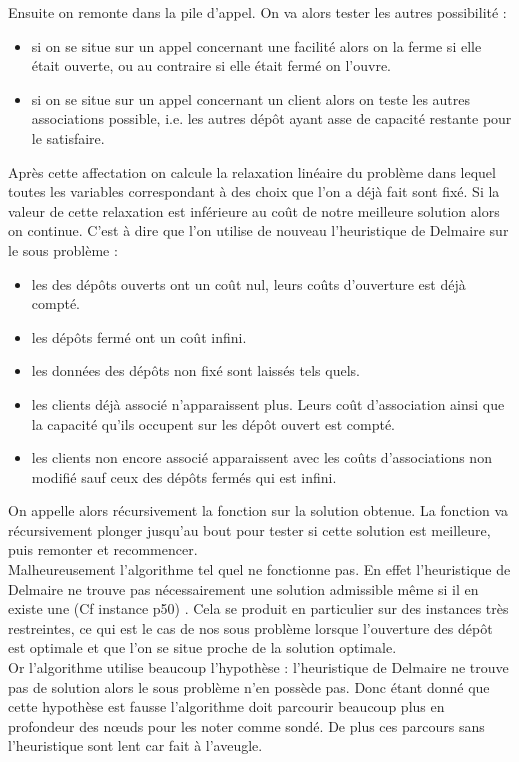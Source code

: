\documentclass[12pt,a4paper]{article}
\begin{document}
Ensuite on remonte dans la pile d’appel. On va alors tester les autres possibilité :
\begin{itemize}
\item
si on se situe sur un appel concernant une facilité alors on la ferme si elle était ouverte, ou au contraire si elle était fermé on l'ouvre.
\item
si on se situe sur un appel concernant un client alors on teste les autres associations possible, i.e. les autres dépôt ayant asse de capacité restante pour le satisfaire.
\end{itemize}
Après cette affectation on calcule la relaxation linéaire du problème dans lequel toutes les variables correspondant à des choix que l'on a déjà fait sont fixé. Si la valeur de cette relaxation est inférieure au coût de notre meilleure solution alors on continue. C'est à dire que l'on utilise de nouveau l'heuristique de Delmaire sur le sous problème :
\begin{itemize}
\item
les des dépôts ouverts ont un coût nul, leurs coûts d'ouverture est déjà compté.
\item
les dépôts fermé ont un coût infini.
\item
les données des dépôts non fixé sont laissés tels quels.
\item
les clients déjà associé n’apparaissent plus. Leurs coût d'association ainsi que la capacité qu'ils occupent sur les dépôt ouvert est compté.
\item
les clients non encore associé apparaissent avec les coûts d'associations non modifié sauf ceux des dépôts fermés qui est infini.
\end{itemize}
On appelle alors récursivement la fonction sur la solution obtenue. La fonction va récursivement plonger jusqu'au bout pour tester si cette solution est meilleure, puis remonter et recommencer.\\

Malheureusement l'algorithme tel quel ne fonctionne pas. En effet l'heuristique de Delmaire ne trouve pas nécessairement une solution admissible même si il en existe une (Cf instance p50) . Cela se produit en particulier sur des instances très restreintes, ce qui est le cas de nos sous problème lorsque l'ouverture des dépôt est optimale et que l'on se situe proche de la solution optimale.\\
Or l'algorithme utilise beaucoup l'hypothèse : l'heuristique de Delmaire ne trouve pas de solution alors le sous problème n'en possède pas. Donc étant donné que cette hypothèse est fausse l'algorithme doit parcourir beaucoup plus en profondeur des nœuds pour les noter comme sondé. De plus ces parcours sans l’heuristique sont lent car fait à l'aveugle.\\
\end{document}
